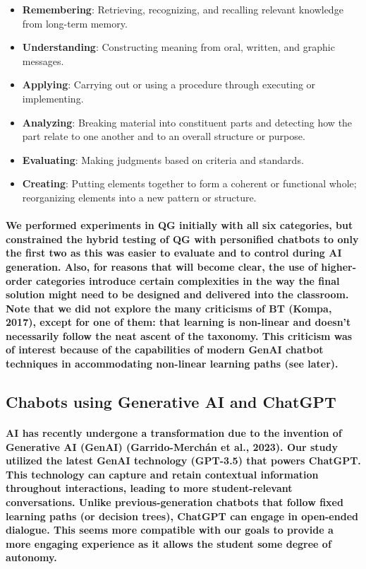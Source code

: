 \documentclass{article}
\begin{document}
\begin{itemize}
    \item \textbf{Remembering}: Retrieving, recognizing, and recalling relevant knowledge from long-term memory.
    \item \textbf{Understanding}: Constructing meaning from oral, written, and graphic messages.
    \item \textbf{Applying}: Carrying out or using a procedure through executing or implementing.
    \item \textbf{Analyzing}: Breaking material into constituent parts and detecting how the part relate to one another and to an overall structure or purpose.
    \item \textbf{Evaluating}: Making judgments based on criteria and standards.
    \item \textbf{Creating}: Putting elements together to form a coherent or functional whole; reorganizing elements into a new pattern or structure.

\end{itemize}

\paragraph{We performed experiments in QG initially with all six categories, but constrained the hybrid testing of QG with personified chatbots to only the first two as this was easier to evaluate and to control during AI generation. Also, for reasons that will become clear, the use of higher-order categories introduce certain complexities in the way the final solution might need to be designed and delivered into the classroom. Note that we did not explore the many criticisms of BT (Kompa, 2017), except for one of them: that learning is non-linear and doesn’t necessarily follow the neat ascent of the taxonomy. This criticism was of interest because of the capabilities of modern GenAI chatbot techniques in accommodating non-linear learning paths (see later).}

\subsection*{Chabots using Generative AI and ChatGPT}

\paragraph{AI has recently undergone a transformation due to the invention of Generative AI (GenAI) (Garrido-Merchán et al., 2023). Our study utilized the latest GenAI technology (GPT-3.5) that powers ChatGPT. This technology can capture and retain contextual information throughout interactions, leading to more student-relevant conversations. Unlike previous-generation chatbots that follow fixed learning paths (or decision trees), ChatGPT can engage in open-ended dialogue. This seems more compatible with our goals to provide a more engaging experience as it allows the student some degree of autonomy.}
\end{document}
